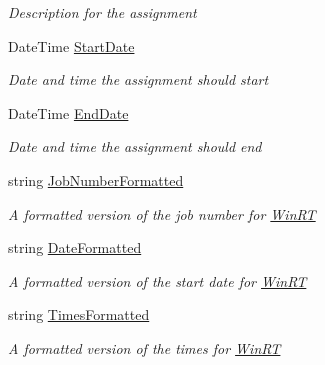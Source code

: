 \begin{DoxyCompactItemize}
\begin{DoxyCompactList}\small\item\em Description for the assignment \end{DoxyCompactList}\item 
Date\+Time \hyperlink{class_field_service_1_1_data_1_1_assignment_history_a39f1120335a45caf7d9a87fde2bed323}{Start\+Date}
\begin{DoxyCompactList}\small\item\em Date and time the assignment should start \end{DoxyCompactList}\item 
Date\+Time \hyperlink{class_field_service_1_1_data_1_1_assignment_history_aa08c504502577cf98c7dcaaa75484660}{End\+Date}
\begin{DoxyCompactList}\small\item\em Date and time the assignment should end \end{DoxyCompactList}\item 
string \hyperlink{class_field_service_1_1_data_1_1_assignment_history_a4ad7d1dfbe64a441168a4b2564d4a32e}{Job\+Number\+Formatted}
\begin{DoxyCompactList}\small\item\em A formatted version of the job number for \hyperlink{namespace_field_service_1_1_win_r_t}{Win\+R\+T} \end{DoxyCompactList}\item 
string \hyperlink{class_field_service_1_1_data_1_1_assignment_history_a9dfa58e8e679688e455eabb8491b239e}{Date\+Formatted}
\begin{DoxyCompactList}\small\item\em A formatted version of the start date for \hyperlink{namespace_field_service_1_1_win_r_t}{Win\+R\+T} \end{DoxyCompactList}\item 
string \hyperlink{class_field_service_1_1_data_1_1_assignment_history_a84096ce95d07372d223f20c1be34549f}{Times\+Formatted}
\begin{DoxyCompactList}\small\item\em A formatted version of the times for \hyperlink{namespace_field_service_1_1_win_r_t}{Win\+R\+T} \end{DoxyCompactList}\item 

\end{DoxyCompactItemize}
